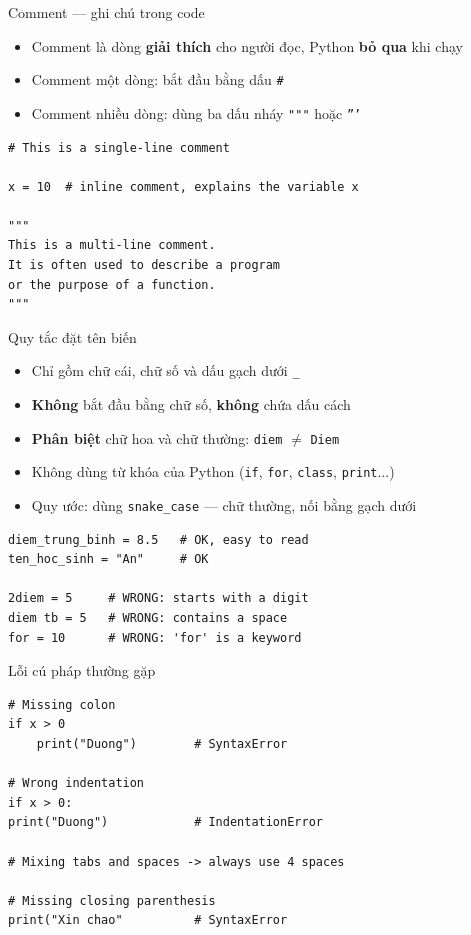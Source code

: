 \documentclass[11pt]{beamer}
\begin{document}
\begin{frame}[fragile]{Comment — ghi chú trong code}
\begin{itemize}
  \item Comment là dòng \textbf{giải thích} cho người đọc, Python \textbf{bỏ qua} khi chạy
  \item Comment một dòng: bắt đầu bằng dấu \texttt{\#}
  \item Comment nhiều dòng: dùng ba dấu nháy \texttt{"""} hoặc \texttt{'''}
\end{itemize}
\begin{lstlisting}
# This is a single-line comment

x = 10  # inline comment, explains the variable x

"""
This is a multi-line comment.
It is often used to describe a program
or the purpose of a function.
"""
\end{lstlisting}
\end{frame}

\begin{frame}[fragile]{Quy tắc đặt tên biến}
\begin{itemize}
  \item Chỉ gồm chữ cái, chữ số và dấu gạch dưới \texttt{\_}
  \item \textbf{Không} bắt đầu bằng chữ số, \textbf{không} chứa dấu cách
  \item \textbf{Phân biệt} chữ hoa và chữ thường: \texttt{diem} $\neq$ \texttt{Diem}
  \item Không dùng từ khóa của Python (\texttt{if}, \texttt{for}, \texttt{class}, \texttt{print}...)
  \item Quy ước: dùng \texttt{snake\_case} — chữ thường, nối bằng gạch dưới
\end{itemize}
\begin{lstlisting}
diem_trung_binh = 8.5   # OK, easy to read
ten_hoc_sinh = "An"     # OK

2diem = 5     # WRONG: starts with a digit
diem tb = 5   # WRONG: contains a space
for = 10      # WRONG: 'for' is a keyword
\end{lstlisting}
\end{frame}

\begin{frame}[fragile]{Lỗi cú pháp thường gặp}
\begin{lstlisting}
# Missing colon
if x > 0
    print("Duong")        # SyntaxError

# Wrong indentation
if x > 0:
print("Duong")            # IndentationError

# Mixing tabs and spaces -> always use 4 spaces

# Missing closing parenthesis
print("Xin chao"          # SyntaxError
\end{lstlisting}
\end{frame}
\end{document}
